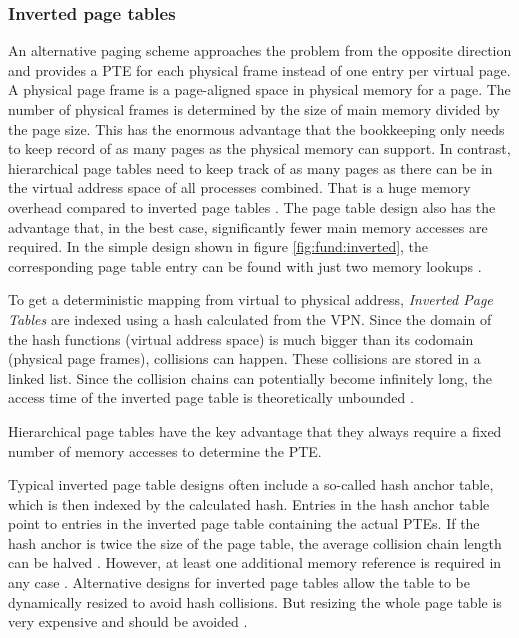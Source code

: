 \subsubsection{Inverted page tables}
An alternative paging scheme approaches the problem from the opposite direction and provides a PTE
for each physical frame instead of one entry per virtual page.
A physical page frame is a page-aligned space in physical memory for a page.
The number of physical frames is determined by the size of main memory divided by the page size.
This has the enormous advantage that the bookkeeping only needs to keep record of as many pages
as the physical memory can support.
In contrast, hierarchical page tables need to keep track of as many pages as there can be in the virtual
address space of all processes combined. That is a huge memory overhead compared to inverted page tables
\cite{jacob1998look}.
The page table design also has the advantage that, in the best case, significantly fewer main memory
accesses are required. In the simple design shown in figure \ref{fig:fund:inverted}, the corresponding
page table entry can be found with just two memory lookups \cite{skarlatos2020elastic}.

To get a deterministic mapping from virtual to physical address, \emph{Inverted Page Tables} are indexed
using a hash calculated from the VPN.
Since the domain of the hash functions (virtual address space) is much bigger than its codomain (physical page frames),
collisions can happen. These collisions are stored in a linked list. Since
the collision chains can potentially become infinitely long, the access time of the inverted page table is theoretically
unbounded \cite{tanenbaumOS}.

Hierarchical page tables have the key advantage that they always require
a fixed number of memory accesses to determine the PTE.

Typical inverted page table designs often include a so-called hash anchor table, which is then
indexed by the calculated hash. Entries in the hash anchor table point to entries in the inverted page table
containing the actual PTEs. If the hash anchor is twice the size
of the page table, the average collision chain length can be halved \cite{jacob1998virtualissues}.
However, at least one additional memory reference is required in any case \cite{jacob1998virtualissues}.
Alternative designs for inverted page tables allow the table to be dynamically resized to avoid hash collisions.
But resizing the whole page table is very expensive and should be avoided \cite{skarlatos2020elastic}.

